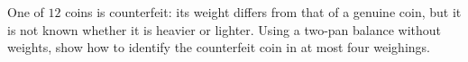 One of $12$ coins is counterfeit: its weight differs from that of a genuine coin, but it is not known whether it is heavier or lighter. Using a two-pan balance without weights, show how to identify the counterfeit coin in at most four weighings.

